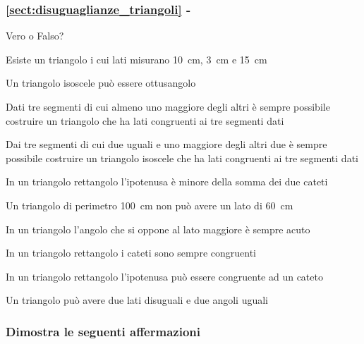 \begingroup
\hypersetup{linkcolor=black}
\subsubsection*{\ref{sect:disuguaglianze_triangoli} - 
}
\endgroup

\begin{esercizio}
\label{ese:3.82}
Vero o Falso? 
\begin{enumeratea}
\item Esiste un triangolo i cui lati misurano 10~cm, 3~cm e 
15~cm\hfill\boxV\quad\boxF
\item Un triangolo isoscele può essere 
ottusangolo\hfill\boxV\quad\boxF
\item Dati tre segmenti di cui almeno uno maggiore degli altri è 
sempre possibile costruire un triangolo che ha lati congruenti ai tre 
segmenti dati\hfill\boxV\quad\boxF
\item Dai tre segmenti di cui due uguali e uno maggiore degli altri 
due è sempre possibile costruire un triangolo isoscele che ha lati 
congruenti ai tre segmenti dati\hfill\boxV\quad\boxF
\item In un triangolo rettangolo l'ipotenusa è minore della somma dei 
due cateti\hfill\boxV\quad\boxF
\item Un triangolo di perimetro 100~cm non può avere un lato di 
60~cm\hfill\boxV\quad\boxF
\item In un triangolo l'angolo che si oppone al lato maggiore è 
sempre acuto\hfill\boxV\quad\boxF
\item In un triangolo rettangolo i cateti sono sempre 
congruenti\hfill\boxV\quad\boxF
\item In un triangolo rettangolo l'ipotenusa può essere congruente ad 
un cateto\hfill\boxV\quad\boxF
\item Un triangolo può avere due lati disuguali e due angoli 
uguali\hfill\boxV\quad\boxF
\end{enumeratea}
\end{esercizio}

\subsubsection*{Dimostra le seguenti affermazioni}

